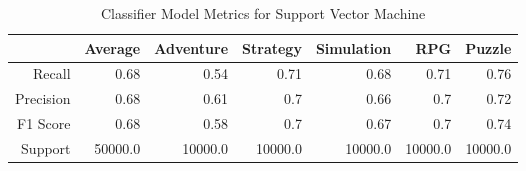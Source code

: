 \begin{table}[h]
    \centering
    \begin{tabular}{r|r|r|r|r|r|r}
        & Average & Adventure & Strategy & Simulation & RPG & Puzzle \\\hline
        Recall      & 0.68 & 0.54 & 0.71 & 0.68 & 0.71 & 0.76\\
        Precision   & 0.68 & 0.61 & 0.7 & 0.66 & 0.7 & 0.72\\
        F1 Score    & 0.68 & 0.58 & 0.7 & 0.67 & 0.7 & 0.74\\
        Support     & 50000.0 & 10000.0 & 10000.0 & 10000.0 & 10000.0 & 10000.0
\end{tabular}
    \caption{Classifier Model Metrics for Support Vector Machine}
    \label{tab:model_metrics}
\end{table}